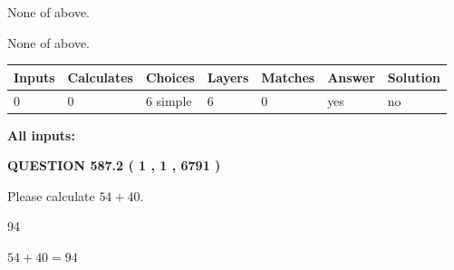 \documentclass[12pt]{article}
\begin{document}
 
 None of above.
 
 
\noindent{}
 
 
 None of above.
 
 
\noindent{}
 
 
   
   
   
   
\noindent\begin{tabular}{|l|l|l|l|l|l|l|}
 \hline
Inputs & Calculates & Choices & Layers & Matches & Answer & Solution \\ \hline
 0  & 
 0  & 
 6
  simple  
  & 
 6  & 
 0  & 
  yes & 
  no 
  \\ \hline
 \end{tabular}
   
   
   
   
\noindent{}
   
   
   
   
\noindent\vspace{0.1in}\hspace{-0.08in} {\textbf{\Large{All inputs: }}}
   
   
  
\vspace{0.2in}
  
{\textbf{\Large{QUESTION
587.2 
 ( 1 , 1 , 6791 )
}}}
  
  
 
Please calculate $ %
54 +  %
40 $.
 
 
 
\noindent{}
 
 

94
 
 
\noindent{}
 
 

 
 
 
\noindent{}
 
 

$ %
54 +  %
40=   %
94$
 
 
\noindent{}
 
\end{document}
